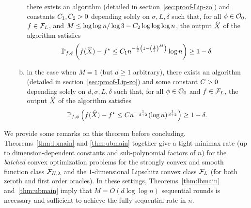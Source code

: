 \begin{theorem}
\begin{enumerate}[1.]
\begin{enumerate}[(a)]
	there exists an algorithm (detailed in section~\ref{sec:proof-Lip-zo})
	and constants $C_1, C_2 > 0$ depending solely on $\sigma, L, \delta$ 
	such that, for all $\phi \in \mathcal{O}_0$, $f\in \mathcal{F}_L$, 
	and $M \leq \log \log n/\log 3 - C_2 \log\log\log n$,
	the output $\widehat{X}$ of the algorithm satisfies
\begin{equation*}
\mathbb{P}_{f, \phi} \left(f(\widehat{X}) - f^\star  \leq  C_1
	n^{-\frac{1}{2} \left(1 - \left(\frac{1}{3}\right)^M\right)} \log n\right) \geq 1-\delta.
\end{equation*}	
\item in the case when $M = 1$ (but $d \geq 1$ arbitrary),  
	there exists an algorithm (detailed in section~\ref{sec:proof-Lip-zo})
	and some constant $C > 0$ depending solely on $d, \sigma, L, 
	\delta$ 
	such that, for all
	$\phi \in \mathcal{O}_0$ and $f \in \mathcal{F}_L$, the output $\widehat{X}$ of 
	the algorithm satisfies
\begin{equation*}
\mathbb{P}_{f, \phi} \left(f(\widehat{X}) - f^\star  \leq  C n^{-\frac{1}{d+2}}
	(\log n)^\frac{1}{d+2} \right) \geq 1-\delta.
\end{equation*}	
\end{enumerate}
\end{enumerate}
\end{theorem}

We provide some remarks on this theorem before concluding.
Theorems~\ref{thm:lbmain} and \ref{thm:ubmain} together give a
tight minimax rate (up to dimension-dependent
constants and sub-polynomial factors of $n$) for
the \emph{batched} convex optimization problems for the
strongly convex and smooth function class $\mathcal{F}_{H, \lambda}$
and the $1$-dimensional Lipschitz convex class $\mathcal{F}_L$ 
(for both zeroth and first order oracles).
In these settings, Theorems~\ref{thm:lbmain}
and~\ref{thm:ubmain} imply that $M = \tilde{O} (d \log \log n)$ sequential
rounds is 
necessary and sufficient to achieve the fully sequential rate in $n$.

